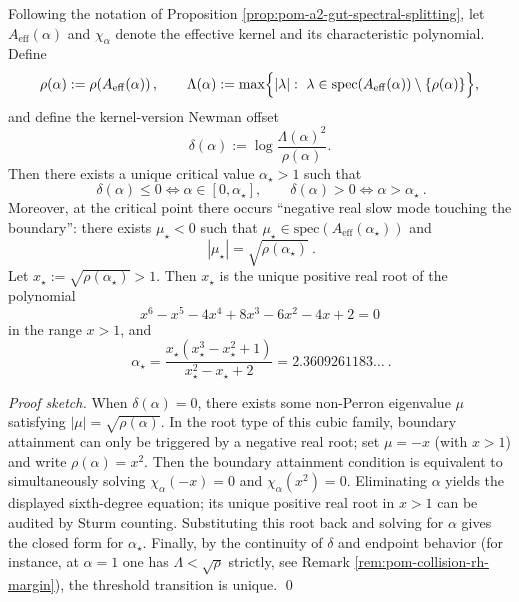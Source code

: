 \begin{proposition}\label{prop:pom-a2-gut-newman-threshold}
Following the notation of Proposition \ref{prop:pom-a2-gut-spectral-splitting}, let \(A_{\mathrm{eff}}(\alpha)\) and \(\chi_\alpha\) denote the effective kernel and its characteristic polynomial.
Define
\[
\rho(\alpha):=\rho\!\left(A_{\mathrm{eff}}(\alpha)\right),\qquad
\Lambda(\alpha):=\max\Bigl\{|\lambda|:\ \lambda\in\mathrm{spec}(A_{\mathrm{eff}}(\alpha))\setminus\{\rho(\alpha)\}\Bigr\},
\]
and define the kernel-version Newman offset
\[
\delta(\alpha):=\log\frac{\Lambda(\alpha)^2}{\rho(\alpha)}.
\]
Then there exists a unique critical value \(\alpha_\star>1\) such that
\[
\boxed{\ \delta(\alpha)\le 0\iff \alpha\in[0,\alpha_\star],\qquad \delta(\alpha)>0\iff \alpha>\alpha_\star\ }.
\]
Moreover, at the critical point there occurs ``negative real slow mode touching the boundary'': there exists \(\mu_\star<0\) such that \(\mu_\star\in\mathrm{spec}(A_{\mathrm{eff}}(\alpha_\star))\) and
\[
\boxed{\ |\mu_\star|=\sqrt{\rho(\alpha_\star)}\ }.
\]
Let \(x_\star:=\sqrt{\rho(\alpha_\star)}>1\).
Then \(x_\star\) is the unique positive real root of the polynomial
\[
x^6-x^5-4x^4+8x^3-6x^2-4x+2=0
\]
in the range \(x>1\), and
\[
\boxed{\ \alpha_\star=\frac{x_\star(x_\star^3-x_\star^2+1)}{x_\star^2-x_\star+2}=2.3609261183\ldots\ }.
\]
\end{proposition}
\begin{proof}[Proof sketch]
When \(\delta(\alpha)=0\), there exists some non-Perron eigenvalue \(\mu\) satisfying \(|\mu|=\sqrt{\rho(\alpha)}\).
In the root type of this cubic family, boundary attainment can only be triggered by a negative real root; set \(\mu=-x\) (with \(x>1\)) and write \(\rho(\alpha)=x^2\).
Then the boundary attainment condition is equivalent to simultaneously solving
\(
\chi_\alpha(-x)=0
\)
and
\(
\chi_\alpha(x^2)=0
\).
Eliminating \(\alpha\) yields the displayed sixth-degree equation; its unique positive real root in \(x>1\) can be audited by Sturm counting.
Substituting this root back and solving for \(\alpha\) gives the closed form for \(\alpha_\star\).
Finally, by the continuity of \(\delta\) and endpoint behavior (for instance, at \(\alpha=1\) one has \(\Lambda<\sqrt{\rho}\) strictly, see Remark \ref{rem:pom-collision-rh-margin}), the threshold transition is unique. \qed
\end{proof}

